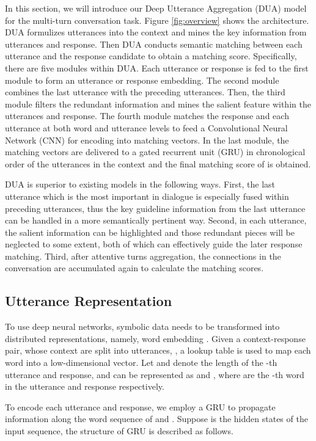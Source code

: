 \documentclass[11pt]{article}
\begin{document}
In this section, we will introduce our Deep Utterance Aggregation (DUA) model for the multi-turn conversation task. Figure \ref{fig:overview} shows the architecture. DUA formulizes utterances into the context and mines the key information from utterances and response. Then DUA conducts semantic matching between each utterance and the response candidate to obtain a matching score. Specifically, there are five modules within DUA. Each utterance or response is fed to the first module to form an utterance or response embedding. The second module combines the last utterance with the preceding utterances. Then, the third module filters the redundant information and mines the salient feature within the utterances and response. The fourth module matches the response and each utterance at both word and utterance levels to feed a Convolutional Neural Network (CNN) for encoding into matching vectors. In the last module, the matching vectors are delivered to a gated recurrent unit (GRU) \cite{Cho2014Learning} in chronological order of the utterances in the context and the final matching score of  is obtained. 

DUA is superior to existing models in the following ways. First, the last utterance which is the most important in dialogue is especially fused within preceding utterances, thus the key guideline information from the last utterance can be handled in a more semantically pertinent way. Second, in each utterance, the salient information can be highlighted and those redundant pieces will be neglected to some extent, both of which can effectively guide the later response matching. Third, after attentive turns aggregation, the connections in the conversation are accumulated again to calculate the matching scores.

\subsection{Utterance Representation}
To use deep neural networks, symbolic data needs to be transformed into distributed representations, namely, word embedding \cite{bengio2003neural,mikolov:2013}.
Given a context-response pair,  whose context are split into utterances, , a lookup table is used to map each word into a low-dimensional vector. Let  and  denote the length of the -th utterance and response,  and  can be represented as  and , where  are the -th word in the utterance and response respectively. 

To encode each utterance and response, we employ a GRU to propagate information along the word sequence of  and . Suppose  is the hidden states of the input sequence, the structure of GRU is described as follows.
\end{document}
